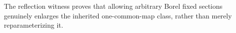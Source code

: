 The reflection witness proves that allowing arbitrary Borel fixed sections genuinely enlarges the inherited one-common-map class, rather than merely reparameterizing it.